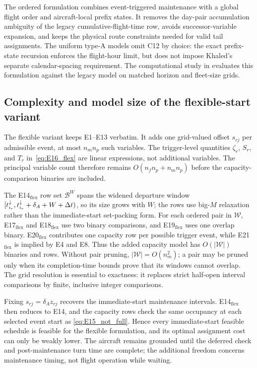 The ordered formulation combines event-triggered maintenance with a global
flight order and aircraft-local prefix states. It removes the day-pair
accumulation ambiguity of the legacy cumulative-flight-time row, avoids successor-variable
expansion, and keeps the physical route constraints needed for valid tail
assignments. The uniform type-A models omit C12 by choice: the exact
prefix-state recursion enforces the flight-hour limit, but does not impose
Khaled's separate calendar-spacing requirement. The
computational study in
 evaluates this formulation against the legacy 
model on matched horizon and fleet-size grids.

\subsection{Complexity and model size of the flexible-start variant}
\label{subsec:flex_complexity}

The flexible variant keeps E1--E13 verbatim. It adds one grid-valued offset
$s_{rj}$ per admissible event, at most $n_mn_p$ such variables. The trigger-level
quantities $\zeta_r$, $S_r$, and $T_r$ in~\eqref{eq:E16_flex} are linear
expressions, not additional variables. The principal variable count therefore
remains $O(n_fn_p+n_mn_p)$ before the capacity-comparison binaries are included.

The E14$_{\mathrm{flex}}$ row set $\mathcal{B}^{W}$ spans the widened departure
window $[t^{\downarrow}_{i_r},t^{\downarrow}_{i_r}+\delta_A+W+\Delta t)$, so its size grows with $W$;
the rows use big-$M$ relaxation rather than the immediate-start set-packing
form. For each ordered pair in $\mathcal{W}$, E17$_{\mathrm{flex}}$ and
E18$_{\mathrm{flex}}$ use two binary comparisons, and
E19$_{\mathrm{flex}}$ uses one overlap binary. E20$_{\mathrm{flex}}$ contributes
one capacity row per possible trigger event, while E21$_{\mathrm{flex}}$ is
implied by E4 and E8. Thus the added capacity model has $O(|\mathcal{W}|)$
binaries and rows. Without pair pruning, $|\mathcal{W}|=O(n_m^2)$; a pair may
be pruned only when its completion-time bounds prove that its windows cannot
overlap. The grid resolution is essential to exactness: it replaces strict
half-open interval comparisons by finite, inclusive integer comparisons.

Fixing $s_{rj}=\delta_Az_{rj}$ recovers the immediate-start maintenance
intervals. E14$_{\mathrm{flex}}$ then reduces to E14, and the capacity rows
check the same occupancy at each selected event start as
\eqref{eq:E15_not_full}. Hence every immediate-start feasible schedule is
feasible for the flexible formulation, and its optimal assignment cost can
only be weakly lower. The aircraft remains grounded until the deferred check
and post-maintenance turn time are complete; the additional freedom concerns
maintenance timing, not flight operation while waiting.
